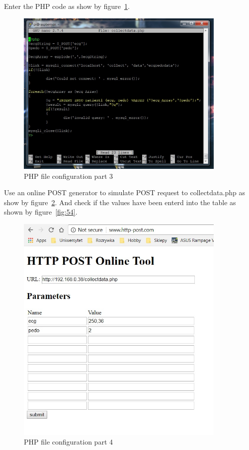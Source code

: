 \documentclass[12pt,]{article}
\begin{document}
Enter the PHP code as show by figure~\ref{fig:52}.
\begin{figure}[H]
  	\begin{center}
    	\includegraphics[width=0.9\textwidth]{Ras_36}
  	\end{center}
  	\caption{PHP file configuration part 3}
	\label{fig:52}
\end{figure}
Use an online POST generator to simulate POST request to collectdata.php as show by figure~\ref{fig:53}. And check if the values have been enterd into the table as shown by figure~\ref{fig:54}.
\begin{figure}[H]
  	\begin{center}
    	\includegraphics[width=0.9\textwidth]{Ras_38}
  	\end{center}
  	\caption{PHP file configuration part 4}
	\label{fig:53}
\end{figure}
\end{document}
